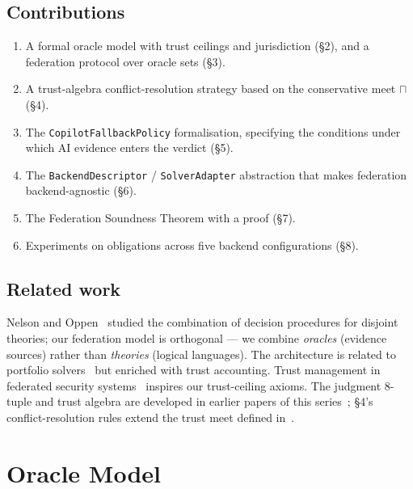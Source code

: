 \documentclass[11pt]{article}
\newcommand{\tmin}{\sqcap}                   %
\begin{document}
\subsection{Contributions}

\begin{enumerate}[label=(\arabic*)]
  \item A formal oracle model with trust ceilings and jurisdiction
        (§2), and a federation protocol over oracle sets (§3).
  \item A trust-algebra conflict-resolution strategy based on the
        conservative meet $\tmin$ (§4).
  \item The \texttt{CopilotFallbackPolicy} formalisation, specifying
        the conditions under which AI evidence enters the verdict (§5).
  \item The \texttt{BackendDescriptor} / \texttt{SolverAdapter}
        abstraction that makes federation backend-agnostic (§6).
  \item The Federation Soundness Theorem with a \LEAN{} proof (§7).
  \item Experiments on \numcases{} obligations across five backend
        configurations (§8).
\end{enumerate}

\subsection{Related work}

Nelson and Oppen~\cite{nelsonoppen79} studied the combination of
decision procedures for disjoint theories; our federation model is
orthogonal — we combine \emph{oracles} (evidence sources) rather than
\emph{theories} (logical languages).  The architecture is related to
portfolio solvers~\cite{portfolio} but enriched with trust accounting.
Trust management in federated security systems~\cite{blaze96} inspires
our trust-ceiling axioms.  The judgment 8-tuple and trust algebra are
developed in earlier papers of this series~\cite{jugeo02,jugeo04};
§4's conflict-resolution rules extend the trust meet defined
in~\cite{jugeo04}.

\section{Oracle Model}\label{sec:oracle-model}
\end{document}

